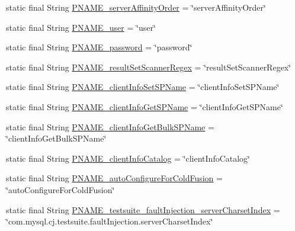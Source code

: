 \begin{DoxyCompactItemize}
\item 
static final String \mbox{\hyperlink{classcom_1_1mysql_1_1cj_1_1conf_1_1_property_definitions_a6a2da04444737d1684fe2a7211c52ee9}{P\+N\+A\+M\+E\+\_\+server\+Affinity\+Order}} = \char`\"{}server\+Affinity\+Order\char`\"{}
\item 
static final String \mbox{\hyperlink{classcom_1_1mysql_1_1cj_1_1conf_1_1_property_definitions_ab87de3c03200eb2a5cc084b3962690f9}{P\+N\+A\+M\+E\+\_\+user}} = \char`\"{}user\char`\"{}
\item 
static final String \mbox{\hyperlink{classcom_1_1mysql_1_1cj_1_1conf_1_1_property_definitions_a7e247bbbe85ec34ce7f63f5db4622759}{P\+N\+A\+M\+E\+\_\+password}} = \char`\"{}password\char`\"{}
\item 
static final String \mbox{\hyperlink{classcom_1_1mysql_1_1cj_1_1conf_1_1_property_definitions_a0fa50d56636f8f4f5c9dbe35efdf98c6}{P\+N\+A\+M\+E\+\_\+result\+Set\+Scanner\+Regex}} = \char`\"{}result\+Set\+Scanner\+Regex\char`\"{}
\item 
static final String \mbox{\hyperlink{classcom_1_1mysql_1_1cj_1_1conf_1_1_property_definitions_a0dd11dcd01b42cec3c4e90c09c97aa97}{P\+N\+A\+M\+E\+\_\+client\+Info\+Set\+S\+P\+Name}} = \char`\"{}client\+Info\+Set\+S\+P\+Name\char`\"{}
\item 
static final String \mbox{\hyperlink{classcom_1_1mysql_1_1cj_1_1conf_1_1_property_definitions_a32c8533db286709287c16b558ed739b9}{P\+N\+A\+M\+E\+\_\+client\+Info\+Get\+S\+P\+Name}} = \char`\"{}client\+Info\+Get\+S\+P\+Name\char`\"{}
\item 
static final String \mbox{\hyperlink{classcom_1_1mysql_1_1cj_1_1conf_1_1_property_definitions_af02265149172d18587bf6ea8874215be}{P\+N\+A\+M\+E\+\_\+client\+Info\+Get\+Bulk\+S\+P\+Name}} = \char`\"{}client\+Info\+Get\+Bulk\+S\+P\+Name\char`\"{}
\item 
static final String \mbox{\hyperlink{classcom_1_1mysql_1_1cj_1_1conf_1_1_property_definitions_a86658c92ce8eecee2f63facaced20696}{P\+N\+A\+M\+E\+\_\+client\+Info\+Catalog}} = \char`\"{}client\+Info\+Catalog\char`\"{}
\item 
static final String \mbox{\hyperlink{classcom_1_1mysql_1_1cj_1_1conf_1_1_property_definitions_ac79ee30bb7475ab6a2e606f2c60786d7}{P\+N\+A\+M\+E\+\_\+auto\+Configure\+For\+Cold\+Fusion}} = \char`\"{}auto\+Configure\+For\+Cold\+Fusion\char`\"{}
\item 
static final String \mbox{\hyperlink{classcom_1_1mysql_1_1cj_1_1conf_1_1_property_definitions_a75dc743d07d54749b0e8d1b63c1d3f02}{P\+N\+A\+M\+E\+\_\+testsuite\+\_\+fault\+Injection\+\_\+server\+Charset\+Index}} = \char`\"{}com.\+mysql.\+cj.\+testsuite.\+fault\+Injection.\+server\+Charset\+Index\char`\"{}
\end{DoxyCompactItemize}


